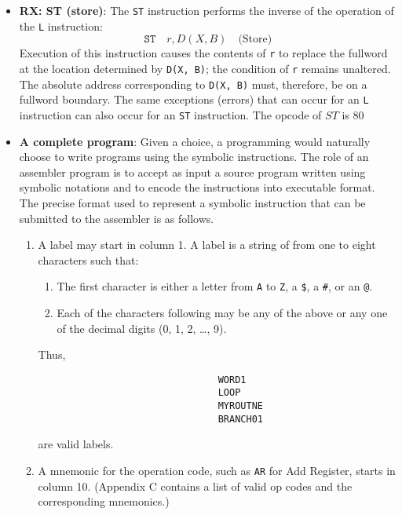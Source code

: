 \documentclass{report}
\begin{document}
\begin{itemize}
                \item \textbf{RX: ST (store)}: The \texttt{ST} instruction performs the inverse of the operation of the \texttt{L} instruction:
                    \[
                        \texttt{ST} \quad r, D(X, B) \quad \text{(Store)}
                    \]
                    Execution of this instruction causes the contents of \texttt{r} to replace the fullword at the location determined by \texttt{D(X, B)}; the condition of \texttt{r} remains unaltered. The absolute address corresponding to \texttt{D(X, B)} must, therefore, be on a fullword boundary. The same exceptions (errors) that can occur for an \texttt{L} instruction can also occur for an \texttt{ST} instruction.
                    \bigbreak \noindent 
                    The opcode of $ST$ is $80$
                \item \textbf{A complete program}: Given a choice, a programming would naturally choose to write programs using the symbolic instructions. The role of an assembler program is to accept as input a source program written using symbolic notations and to encode the instructions into executable  format. The precise format used to represent a symbolic instruction that can be submitted to the assembler is as follows.
                    \begin{enumerate}
                        \item A label may start in column 1. A label is a string of from one to eight characters such that:
                            \begin{enumerate}
                                \item The first character is either a letter from \texttt{A} to \texttt{Z}, a \texttt{\$}, a \texttt{\#}, or an \texttt{@}.
                                \item Each of the characters following may be any of the above or any one of the decimal digits (0, 1, 2, \dots, 9).
                            \end{enumerate}
                            Thus,
                            \begin{verbatim}
                                WORD1
                                LOOP
                                MYROUTNE
                                BRANCH01
                            \end{verbatim}
                            are valid labels. 
                        \item A mnemonic for the operation code, such as \texttt{AR} for Add Register, starts in column 10. (Appendix C contains a list of valid op codes and the corresponding mnemonics.)

\end{enumerate}
\end{itemize}
\end{document}
